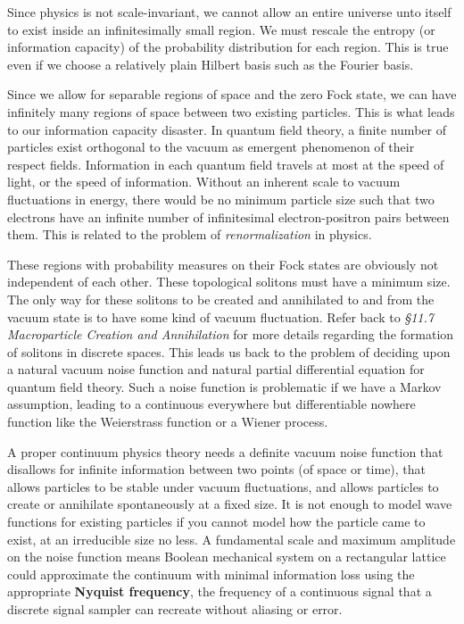 \documentclass[10pt, a5paper, twoside, openright]{memoir}
\begin{document}
Since physics is not scale-invariant, we cannot allow an entire universe unto itself to exist inside an infinitesimally small region. We must rescale the entropy (or information capacity) of the probability distribution for each region. This is true even if we choose a relatively plain Hilbert basis such as the Fourier basis.

Since we allow for separable regions of space and the zero Fock state, we can have infinitely many regions of space between two existing particles. This is what leads to our information capacity disaster. In quantum field theory, a finite number of particles exist orthogonal to the vacuum as emergent phenomenon of their respect fields. Information in each quantum field travels at most at the speed of light, or the speed of information. Without an inherent scale to vacuum fluctuations in energy, there would be no minimum particle size such that two electrons have an infinite number of infinitesimal electron-positron pairs between them. This is related to the problem of \textit{renormalization} in physics.

These regions with probability measures on their Fock states are obviously not independent of each other. These topological solitons must have a minimum size. The only way for these solitons to be created and annihilated to and from the vacuum state is to have some kind of vacuum fluctuation. Refer back to \textit{\S 11.7 Macroparticle Creation and Annihilation} for more details regarding the formation of solitons in discrete spaces. This leads us back to the problem of deciding upon a natural vacuum noise function and natural partial differential equation for quantum field theory. Such a noise function is problematic if we have a Markov assumption, leading to a continuous everywhere but differentiable nowhere function like the Weierstrass function or a Wiener process.

A proper continuum physics theory needs a definite vacuum noise function that disallows for infinite information between two points (of space or time), that allows particles to be stable under vacuum fluctuations, and allows particles to create or annihilate spontaneously at a fixed size. It is not enough to model wave functions for existing particles if you cannot model how the particle came to exist, at an irreducible size no less. A fundamental scale and maximum amplitude on the noise function means Boolean mechanical system on a rectangular lattice could approximate the continuum with minimal information loss using the appropriate \textbf{Nyquist frequency}, the frequency of a continuous signal that a discrete signal sampler can recreate without aliasing or error.
\end{document}

